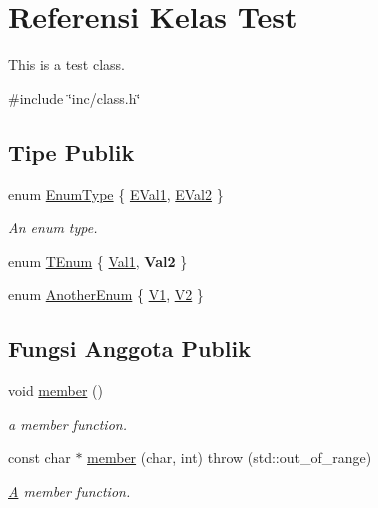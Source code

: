 \hypertarget{classTest}{}\section{Referensi Kelas Test}
\label{classTest}


This is a test class.  




{\ttfamily \#include \char`\"{}inc/class.\+h\char`\"{}}

\subsection*{Tipe Publik}
\begin{DoxyCompactItemize}
\item 
enum \hyperlink{classTest_a26bf93efdaea3c6e2cfa4119c3755d3f}{Enum\+Type} \{ \hyperlink{classTest_a26bf93efdaea3c6e2cfa4119c3755d3faacfab1e4105c05a2e503931a0e82b5b0}{E\+Val1}, 
\hyperlink{classTest_a26bf93efdaea3c6e2cfa4119c3755d3fae2fa04fb1c4db1f7d72b8781ba19ffcc}{E\+Val2}
 \}
\begin{DoxyCompactList}\small\item\em An enum type. \end{DoxyCompactList}\item 
enum \hyperlink{classTest_ad8d13fe56b896633273087859b89a1a3}{T\+Enum} \{ \hyperlink{classTest_ad8d13fe56b896633273087859b89a1a3a24d1337b7c053feaf5f44846fb7785a8}{Val1}, 
{\bfseries Val2}
 \}
\item 
enum \hyperlink{classTest_a34b5b35cdcd492c108e62275d647bcf4}{Another\+Enum} \{ \hyperlink{classTest_a34b5b35cdcd492c108e62275d647bcf4a4250af92f4c971e7217dfa695b169d33}{V1}, 
\hyperlink{classTest_a34b5b35cdcd492c108e62275d647bcf4ac65e3839243b8dcbdf72157f108265b2}{V2}
 \}
\end{DoxyCompactItemize}
\subsection*{Fungsi Anggota Publik}
\begin{DoxyCompactItemize}
\item 
\hypertarget{classTest_ad86c7affdfb5ca8e720f44ef56169c50}{}void \hyperlink{classTest_ad86c7affdfb5ca8e720f44ef56169c50}{member} ()\label{classTest_ad86c7affdfb5ca8e720f44ef56169c50}

\begin{DoxyCompactList}\small\item\em a member function. \end{DoxyCompactList}\item 
const char $\ast$ \hyperlink{classTest_a45b6a232a4499f8ce37062eab5451570}{member} (char, int)  throw (std\+::out\+\_\+of\+\_\+range)
\begin{DoxyCompactList}\small\item\em \hyperlink{classA}{A} member function. \end{DoxyCompactList}\end{DoxyCompactItemize}
